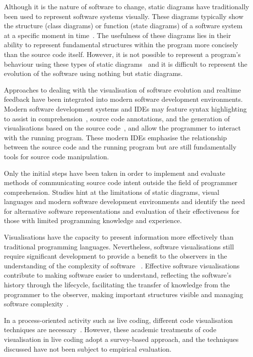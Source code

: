 Although it is the nature of software to change, static diagrams have traditionally been used to represent software systems visually. These diagrams typically show the structure (class diagrams) or function (state diagrams) of a software system at a specific moment in time~\cite{Rumbaugh2004}. The usefulness of these diagrams lies in their ability to represent fundamental structures within the program more concisely than the source code itself. However, it is not possible to represent a program's behaviour using these types of static diagrams~\cite{Baecker1998} and it is difficult to represent the evolution of the software using nothing but static diagrams.

Approaches to dealing with the visualisation of software evolution and realtime feedback have been integrated into modern software development environments. Modern software development systems and \acp{IDE} may feature syntax highlighting to assist in comprehension~\cite{Chen2005,Reis}, source code annotations, and the generation of visualisations based on the source code~\cite{Hendrix2004}, and allow the programmer to interact with the running program. These modern \acp{IDE} emphasise the relationship between the source code and the running program but are still fundamentally tools for source code manipulation.

Only the initial steps have been taken in order to implement and evaluate methods of communicating source code intent outside the field of programmer comprehension. Studies hint at the limitations of static diagrams, visual languages and modern software development environments and identify the need for alternative software representations and evaluation of their effectiveness for those with limited programming knowledge and experience. 

Visualisations have the capacity to present information more effectively than traditional programming languages. Nevertheless, software visualisations still require significant development to provide a benefit to the observers in the understanding of the complexity of software ~\cite{Baecker1995}. Effective software visualisations contribute to making software easier to understand, reflecting the software's history through the lifecycle, facilitating the transfer of knowledge from the programmer to the observer, making important structures visible and managing software complexity~\cite{Baecker1995}.

In a process-oriented activity such as live coding, different code visualisation techniques are necessary~\cite{McLean2010a,Magnusson2013}. However, these academic treatments of code visualisation in live coding adopt a survey-based approach, and the techniques discussed have not been subject to empirical evaluation.

